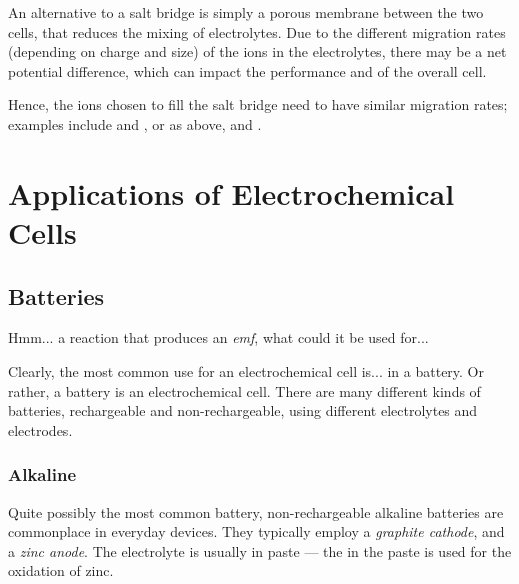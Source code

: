 				An alternative to a salt bridge is simply a porous membrane between the two cells, that reduces the mixing of electrolytes.
				Due to the different migration rates (depending on charge and size) of the ions in the electrolytes, there may be a net potential
				difference, which can impact the performance and \Ecell{} of the overall cell.

				Hence, the ions chosen to fill the salt bridge need to have similar migration rates; examples include  and , or
				as above,  and \ch{\Cl-}.














	\pagebreak
	\section{Applications of Electrochemical Cells}

		\subsection{Batteries}

			Hmm... a reaction that produces an \textit{emf}, what could it be used for...

			Clearly, the most common use for an electrochemical cell is... in a battery. Or rather, a battery is an electrochemical cell.
			There are many different kinds of batteries, rechargeable and non-rechargeable, using different electrolytes and electrodes.


			\subsubsection{Alkaline}

				Quite possibly the most common battery, non-rechargeable alkaline batteries are commonplace in everyday devices. They
				typically employ a \textit{graphite cathode}, and a \textit{zinc anode}. The electrolyte is usually  in 
				paste --- the  in the paste is used for the oxidation of zinc.

